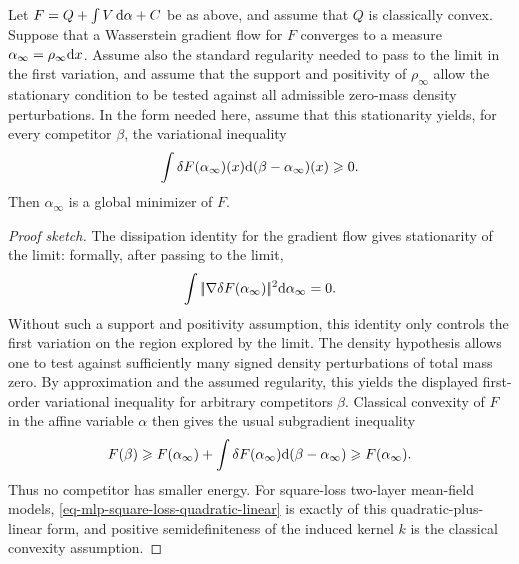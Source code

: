 \begin{prop}\label{prop-classical-convex-stationary}
	Let $F=Q+\int V\,\mathrm{d}\alpha+C$ be as above, and assume that $Q$ is classically convex. Suppose that a Wasserstein gradient flow for $F$ converges to a measure $\alpha_\infty=\rho_\infty\mathrm{d} x$. Assume also the standard regularity needed to pass to the limit in the first variation, and assume that the support and positivity of $\rho_\infty$ allow the stationary condition to be tested against all admissible zero-mass density perturbations. In the form needed here, assume that this stationarity yields, for every competitor $\beta$, the variational inequality
	\[
		\int \delta F(\alpha_\infty)(x)\mathrm{d}(\beta-\alpha_\infty)(x)\geqslant0.
	\]
	Then $\alpha_\infty$ is a global minimizer of $F$.
\end{prop}
\begin{proof}[Proof sketch]
	The dissipation identity for the gradient flow gives stationarity of the limit: formally, after passing to the limit,
	\[
		\int |\!| \nabla \delta F(\alpha_\infty) |\!|^2\mathrm{d}\alpha_\infty=0.
	\]
	Without such a support and positivity assumption, this identity only controls the first variation on the region explored by the limit. The density hypothesis allows one to test against sufficiently many signed density perturbations of total mass zero. By approximation and the assumed regularity, this yields the displayed first-order variational inequality for arbitrary competitors $\beta$. Classical convexity of $F$ in the affine variable $\alpha$ then gives the usual subgradient inequality
	\[
		F(\beta)\geqslant F(\alpha_\infty)
		+
		\int \delta F(\alpha_\infty)\mathrm{d}(\beta-\alpha_\infty)
		\geqslant F(\alpha_\infty).
	\]
	Thus no competitor has smaller energy. For square-loss two-layer mean-field models, \eqref{eq-mlp-square-loss-quadratic-linear} is exactly of this quadratic-plus-linear form, and positive semidefiniteness of the induced kernel $k$ is the classical convexity assumption.
\end{proof}

